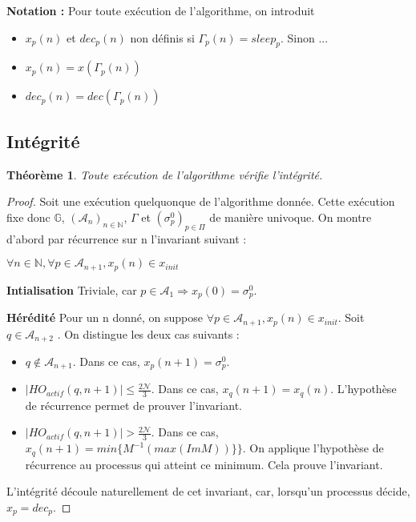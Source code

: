 \documentclass{article}
\newtheorem{theorem}{Théorème}
\begin{document}
\textbf{Notation :} Pour toute exécution de l'algorithme, on introduit
\begin{itemize}

	\item $x_p(n)$ et $dec_p(n)$ non définis si $\Gamma_p(n) = sleep_p$. Sinon ...
	\item $x_p(n) = x(\Gamma_p(n))$
	\item $dec_p(n) = dec(\Gamma_p(n))$

\end{itemize}

\subsection{Intégrité}

\begin{theorem}
	Toute exécution de l'algorithme vérifie l'intégrité.
\end{theorem}
\begin{proof}
	Soit une exécution quelquonque de l'algorithme donnée. Cette exécution fixe donc $\mathds{G}$, $(\mathcal{A}_n)_{n \in \mathds{N}}$, $\Gamma$ et $(\sigma^0_p)_{p \in \Pi}$ de manière univoque.
	On montre d'abord par récurrence sur n l'invariant suivant : 

	$  \forall n \in \mathds{N}, \forall p \in \mathcal{A}_{n+1}, x_p(n) \in x_{init}$

\textbf{Intialisation}
	Triviale, car $p \in \mathcal{A}_1 \Rightarrow x_p(0) = \sigma^0_p$. 

\textbf{Hérédité}
	Pour un n donné, on suppose $\forall p \in \mathcal{A}_{n+1}, x_p(n) \in x_{init}$.
Soit $q \in \mathcal{A}_{n+2}$ . On distingue les deux cas suivants :
\begin{itemize}
	\item $q \notin \mathcal{A}_{n+1}$. Dans ce cas, $x_p(n+1) = \sigma^0_p$.
	\item $|HO_{actif} (q, n+1) | \leq \frac{2\mathcal{N}}{3}$. Dans ce cas, $x_q(n+1) = x_q(n)$. L'hypothèse de récurrence permet de prouver l'invariant.
	\item $|HO_{actif} (q, n+1) | >    \frac{2\mathcal{N}}{3}$. Dans ce cas, $x_q(n+1) = min \{M^{-1} (max (Im M))\}\}$. On applique l'hypothèse de récurrence au processus qui atteint ce minimum.
		Cela prouve l'invariant.

\end{itemize}

L'intégrité découle naturellement de cet invariant, car, lorsqu'un processus décide, $x_p = dec_p$.
\end{proof}
\end{document}
